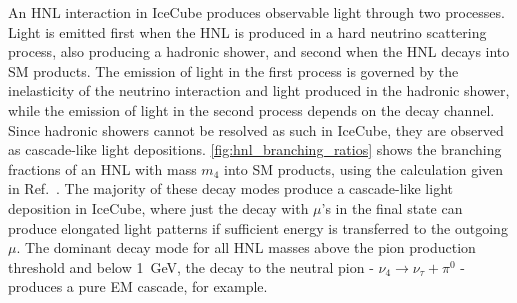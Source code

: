 \documentclass[
    aps,
    prd,
    reprint,
    amsmath,
    amssymb,
    nofootinbib,
    linenumbers,
    superscriptaddress,
    floatfix
]{revtex4-2}
\newcommand{\gev}{\giga\electronvolt}
\begin{document}
An HNL interaction in IceCube produces observable light through two processes.
Light is emitted first when the HNL is produced in a hard neutrino scattering process, also producing a hadronic shower, and second when the HNL decays into SM products.
The emission of light in the first process is governed by the inelasticity of the neutrino interaction and light produced in the hadronic shower, while the emission of light in the second process depends on the decay channel.
Since hadronic showers cannot be resolved as such in IceCube, they are observed as cascade-like light depositions.
\cref{fig:hnl_branching_ratios} shows the branching fractions of an HNL with mass $m_4$ into SM products, using the calculation given in Ref.~\cite{Coloma:2020lgy}.
The majority of these decay modes produce a cascade-like light deposition in IceCube, where just the decay with $\mu$'s in the final state can produce elongated light patterns if sufficient energy is transferred to the outgoing $\mu$. 
The dominant decay mode for all HNL masses above the pion production threshold and below \SI{1}{\gev}, the decay to the neutral pion - $\nu_4 \to \nu_\tau + \pi^0$ - produces a pure EM cascade, for example.
\end{document}
